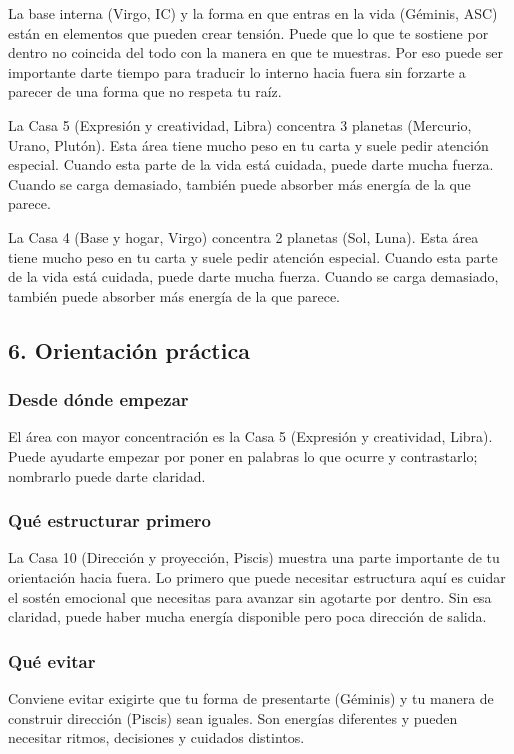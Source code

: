 \documentclass[11pt,a4paper]{article}
\begin{document}
La base interna (Virgo, IC) y la forma en que entras en la vida (Géminis, ASC) están en elementos que pueden crear tensión. Puede que lo que te sostiene por dentro no coincida del todo con la manera en que te muestras. Por eso puede ser importante darte tiempo para traducir lo interno hacia fuera sin forzarte a parecer de una forma que no respeta tu raíz.

La Casa 5 (Expresión y creatividad, Libra) concentra 3 planetas (Mercurio, Urano, Plutón). Esta área tiene mucho peso en tu carta y suele pedir atención especial. Cuando esta parte de la vida está cuidada, puede darte mucha fuerza. Cuando se carga demasiado, también puede absorber más energía de la que parece.

La Casa 4 (Base y hogar, Virgo) concentra 2 planetas (Sol, Luna). Esta área tiene mucho peso en tu carta y suele pedir atención especial. Cuando esta parte de la vida está cuidada, puede darte mucha fuerza. Cuando se carga demasiado, también puede absorber más energía de la que parece.

\vspace{0.5cm}

\subsection{6. Orientación práctica}

\subsubsection*{Desde dónde empezar}
El área con mayor concentración es la Casa 5 (Expresión y creatividad, Libra). Puede ayudarte empezar por poner en palabras lo que ocurre y contrastarlo; nombrarlo puede darte claridad.

\subsubsection*{Qué estructurar primero}
La Casa 10 (Dirección y proyección, Piscis) muestra una parte importante de tu orientación hacia fuera. Lo primero que puede necesitar estructura aquí es cuidar el sostén emocional que necesitas para avanzar sin agotarte por dentro. Sin esa claridad, puede haber mucha energía disponible pero poca dirección de salida.

\subsubsection*{Qué evitar}
Conviene evitar exigirte que tu forma de presentarte (Géminis) y tu manera de construir dirección (Piscis) sean iguales. Son energías diferentes y pueden necesitar ritmos, decisiones y cuidados distintos.
\end{document}
